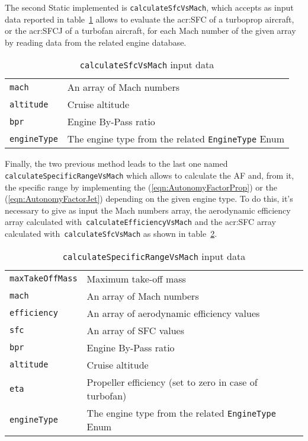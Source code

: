 \bigskip
\noindent
The second \gls{Static} implemented is \lstinline[language=Java]!calculateSfcVsMach!, which accepts as input data reported in table~\ref{table:Table2} allows to evaluate the \gls{acr:SFC} of a turboprop aircraft, or the \gls{acr:SFCJ} of a turbofan aircraft, for each Mach number of the given array by reading data from the related engine database.
%
\begin{table}[t]
\begin{tabular}{p{7cm}p{7.5cm}}
\toprule
\lstinline[language=Java]!mach!	& An array of Mach numbers \\[0.1cm]
\lstinline[language=Java]!altitude! & Cruise altitude \\[0.1cm]
\lstinline[language=Java]!bpr! & Engine By-Pass ratio \\[0.1cm]
\lstinline[language=Java]!engineType! & The engine type from the related \lstinline[language=Java]!EngineType! \gls{Enum} \\
\bottomrule
\end{tabular}
\caption{ \lstinline[language=Java]!calculateSfcVsMach! input data}
\label{table:Table2}
\end{table}

\bigskip
\noindent
Finally, the two previous method leads to the last one named \lstinline[language=Java]!calculateSpecificRangeVsMach! which allows to calculate the \gls{AF} and, from it, the specific range by implementing the (\ref{eqn:AutonomyFactorProp}) or the (\ref{eqn:AutonomyFactorJet}) depending on the given engine type. 
%
To do this, it's necessary to give as input the Mach numbers array, the aerodynamic efficiency array calculated with~\lstinline[language=Java]!calculateEfficiencyVsMach! and the \gls{acr:SFC} array calculated with~\lstinline[language=Java]!calculateSfcVsMach! as shown in table~\ref{table:Table3}.
%
\begin{table}[H]
\begin{tabular}{p{7cm}p{7.5cm}}
\toprule
\lstinline[language=Java]!maxTakeOffMass! & Maximum take-off mass \\[0.1	cm]
\lstinline[language=Java]!mach!	& An array of Mach numbers \\[0.1cm]
\lstinline[language=Java]!efficiency!	& An array of aerodynamic efficiency values \\[0.1cm]
\lstinline[language=Java]!sfc!	& An array of SFC values \\[0.1cm]
\lstinline[language=Java]!bpr! & Engine By-Pass ratio \\[0.1cm]
\lstinline[language=Java]!altitude! & Cruise altitude \\[0.1cm]
\lstinline[language=Java]!eta!	& Propeller efficiency (set to zero in case of turbofan) \\[0.1cm]
\lstinline[language=Java]!engineType! & The engine type from the related \lstinline[language=Java]!EngineType! \gls{Enum} \\
\bottomrule
\end{tabular}
\caption{ \lstinline[language=Java]!calculateSpecificRangeVsMach! input data}
\label{table:Table3}
\end{table}

